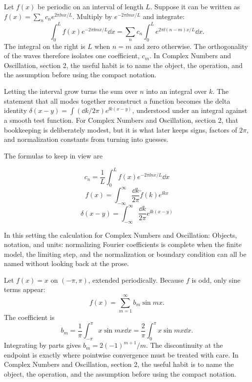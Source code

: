 Let \(f(x)\) be periodic on an interval of length \(L\).  Suppose it can be written as \(f(x)=\sum_n c_ne^{2\pi\ii nx/L}\).  Multiply by \(e^{-2\pi\ii mx/L}\) and integrate:
\[
  \int_0^L f(x)e^{-2\pi\ii mx/L}\dd x
  =
  \sum_n c_n\int_0^L e^{2\pi\ii(n-m)x/L}\dd x.
\]
The integral on the right is \(L\) when \(n=m\) and zero otherwise.  The orthogonality of the waves therefore isolates one coefficient, \(c_m\).  In Complex Numbers and Oscillation, section 2, the useful habit is to name the object, the operation, and the assumption before using the compact notation.

Letting the interval grow turns the sum over \(n\) into an integral over \(k\).  The statement that all modes together reconstruct a function becomes the delta identity \(\delta(x-y)=\int(\dd k/2\pi)e^{\ii k(x-y)}\), understood under an integral against a smooth test function.  For Complex Numbers and Oscillation, section 2, that bookkeeping is deliberately modest, but it is what later keeps signs, factors of \(2\pi\), and normalization constants from turning into guesses.

The formulas to keep in view are

\[
  c_n=\frac1L\int_0^L f(x)e^{-2\pi\ii nx/L}\dd x
\]
\[
  f(x)=\int_{-\infty}^{\infty}\frac{\dd k}{2\pi}\tilde f(k)e^{\ii kx}
\]
\[
  \delta(x-y)=\int_{-\infty}^{\infty}\frac{\dd k}{2\pi}e^{\ii k(x-y)}
\]

In this setting the calculation for Complex Numbers and Oscillation: Objects, notation, and units: normalizing Fourier coefficients is complete when the finite model, the limiting step, and the normalization or boundary condition can all be named without looking back at the prose.




\begin{example}
Let \(f(x)=x\) on \((-\pi,\pi)\), extended periodically.  Because \(f\) is odd, only sine terms appear:
\[
  f(x)=\sum_{m=1}^\infty b_m\sin mx.
\]
The coefficient is
\[
  b_m=\frac1\pi\int_{-\pi}^\pi x\sin mx\dd x
  =\frac2\pi\int_0^\pi x\sin mx\dd x.
\]
Integrating by parts gives \(b_m=2(-1)^{m+1}/m\).  The discontinuity at the endpoint is exactly where pointwise convergence must be treated with care.  In Complex Numbers and Oscillation, section 2, the useful habit is to name the object, the operation, and the assumption before using the compact notation.
\end{example}




